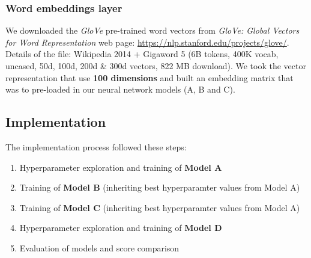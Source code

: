 \documentclass[10pt,journal,compsoc, onecolumn]{IEEEtran}
\begin{document}
\subsubsection{Word embeddings layer}
We downloaded the \textit{GloVe} pre-trained word vectors \cite{Pennington} from \textit{GloVe: Global Vectors for Word Representation} web page: \url{https://nlp.stanford.edu/projects/glove/}. Details of the file: Wikipedia 2014 + Gigaword 5 (6B tokens, 400K vocab, uncased, 50d, 100d, 200d \& 300d vectors, 822 MB download). We took the vector representation that use \textbf{100 dimensions} and built an embedding matrix that was to pre-loaded in our neural network models (A, B and C).

\begin{table}[h]
    \centering
    \caption{Fixed model parameters}
    \label{tab:fixedparams}
\end{table}

\subsection{Implementation}\label{sec:implementation}

The implementation process followed these steps:

\begin{enumerate}
    \item Hyperparameter exploration and training of \textbf{Model A}
    \item Training of \textbf{Model B} (inheriting best hyperparamter values from Model A)
    \item Training of \textbf{Model C} (inheriting best hyperparamter values from Model A)
    \item Hyperparameter exploration and training of \textbf{Model D}
    \item Evaluation of models and score comparison
\end{enumerate}
\end{document}
